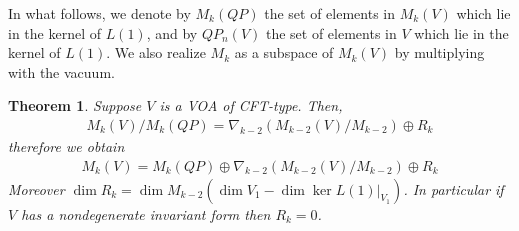 \documentclass[12pt]{amsart}
\theoremstyle{plain}
\newtheorem{thm}{Theorem}[section]
\theoremstyle{definition}
\theoremstyle{remark}
\begin{document}
In what follows, we denote by $M_{k}(QP)$ the set of elements in $M_{k}(V)$ which lie in the kernel of $L(1)$, and by $QP_{n}(V)$ the set of elements in $V$ which lie in the kernel of $L(1)$.  We also realize $M_k$ as a subspace of $M_k(V)$ by multiplying with the vacuum.

\begin{thm}
 Suppose $V$ is a VOA of CFT-type. Then,
\begin{align*}
 M_k(V)/M_k(QP)=\nabla_{k-2}(M_{k-2}(V)/M_{k-2})\oplus R_k
 \end{align*}
 therefore we obtain
\begin{align*}
M_k(V)=M_k(QP)\oplus \nabla_{k-2}(M_{k-2}(V) / 
M_{k-2})\oplus R_k
\end{align*}
Moreover $\dim R_k=\dim M_{k-2}(\dim V_1-\dim \ker L(1)\vert_{V_1})$. In particular if $V$ has a nondegenerate invariant form then $R_k=0$. 
\end{thm}
\end{document}
